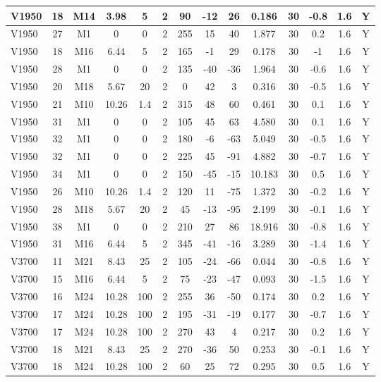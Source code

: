 \documentclass{article}
\begin{document}
\begin{center}
\begin{longtable}{|l|c|c|c|c|c|c|c|c|c|c|c|c|c|}
V1950	&	18	&	M14	&	3.98	&	5	&	2	&	90	&	-12	&	26	&	0.186	&	30	&	-0.8	&	1.6	&	Y	\\\hline
V1950	&	27	&	M1	&	0	&	0	&	2	&	255	&	15	&	40	&	1.877	&	30	&	0.2	&	1.6	&	Y	\\\hline
V1950	&	18	&	M16	&	6.44	&	5	&	2	&	165	&	-1	&	29	&	0.178	&	30	&	-1	&	1.6	&	Y	\\\hline
V1950	&	28	&	M1	&	0	&	0	&	2	&	135	&	-40	&	-36	&	1.964	&	30	&	-0.6	&	1.6	&	Y	\\\hline
V1950	&	20	&	M18	&	5.67	&	20	&	2	&	0	&	42	&	3	&	0.316	&	30	&	-0.5	&	1.6	&	Y	\\\hline
V1950	&	21	&	M10	&	10.26	&	1.4	&	2	&	315	&	48	&	60	&	0.461	&	30	&	0.1	&	1.6	&	Y	\\\hline
V1950	&	31	&	M1	&	0	&	0	&	2	&	105	&	45	&	63	&	4.580	&	30	&	0.1	&	1.6	&	Y	\\\hline
V1950	&	32	&	M1	&	0	&	0	&	2	&	180	&	-6	&	-63	&	5.049	&	30	&	-0.5	&	1.6	&	Y	\\\hline
V1950	&	32	&	M1	&	0	&	0	&	2	&	225	&	45	&	-91	&	4.882	&	30	&	-0.7	&	1.6	&	Y	\\\hline
V1950	&	34	&	M1	&	0	&	0	&	2	&	150	&	-45	&	-15	&	10.183	&	30	&	0.5	&	1.6	&	Y	\\\hline
V1950	&	26	&	M10	&	10.26	&	1.4	&	2	&	120	&	11	&	-75	&	1.372	&	30	&	-0.2	&	1.6	&	Y	\\\hline
V1950	&	28	&	M18	&	5.67	&	20	&	2	&	45	&	-13	&	-95	&	2.199	&	30	&	-0.1	&	1.6	&	Y	\\\hline
V1950	&	38	&	M1	&	0	&	0	&	2	&	210	&	27	&	86	&	18.916	&	30	&	-0.8	&	1.6	&	Y	\\\hline
V1950	&	31	&	M16	&	6.44	&	5	&	2	&	345	&	-41	&	-16	&	3.289	&	30	&	-1.4	&	1.6	&	Y	\\\hline
V3700	&	11	&	M21	&	8.43	&	25	&	2	&	105	&	-24	&	-66	&	0.044	&	30	&	-0.8	&	1.6	&	Y	\\\hline
V3700	&	15	&	M16	&	6.44	&	5	&	2	&	75	&	-23	&	-47	&	0.093	&	30	&	-1.5	&	1.6	&	Y	\\\hline
V3700	&	16	&	M24	&	10.28	&	100	&	2	&	255	&	36	&	-50	&	0.174	&	30	&	0.2	&	1.6	&	Y	\\\hline
V3700	&	17	&	M24	&	10.28	&	100	&	2	&	195	&	-31	&	-19	&	0.177	&	30	&	-0.7	&	1.6	&	Y	\\\hline
V3700	&	17	&	M24	&	10.28	&	100	&	2	&	270	&	43	&	4	&	0.217	&	30	&	0.2	&	1.6	&	Y	\\\hline
V3700	&	18	&	M21	&	8.43	&	25	&	2	&	270	&	-36	&	50	&	0.253	&	30	&	-0.1	&	1.6	&	Y	\\\hline
V3700	&	18	&	M24	&	10.28	&	100	&	2	&	60	&	25	&	72	&	0.295	&	30	&	0.5	&	1.6	&	Y	\\\hline

\end{longtable}
\end{center}
\end{document}
